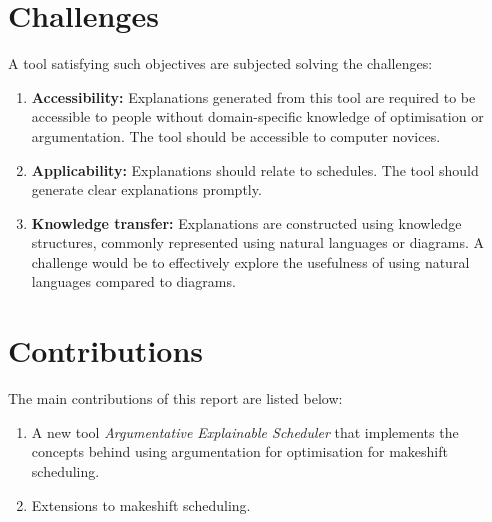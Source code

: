 \section{Challenges}

A tool satisfying such objectives are subjected solving the challenges:
\begin{enumerate}
	\item\textbf{Accessibility:} Explanations generated from this tool are required to be accessible to people without domain-specific knowledge of optimisation or argumentation. The tool should be accessible to computer novices.
	\item\textbf{Applicability:} Explanations should relate to schedules. The tool should generate clear explanations promptly.
	\item\textbf{Knowledge transfer:} Explanations are constructed using knowledge structures, commonly represented using natural languages or diagrams. A challenge would be to effectively explore the usefulness of using natural languages compared to diagrams.

\end{enumerate}

\section{Contributions}

The main contributions of this report are listed below:
\begin{enumerate}
	\item A new tool \emph{Argumentative Explainable Scheduler} that implements the concepts behind using argumentation for optimisation for makeshift scheduling.
	\item Extensions to makeshift scheduling.
\end{enumerate}